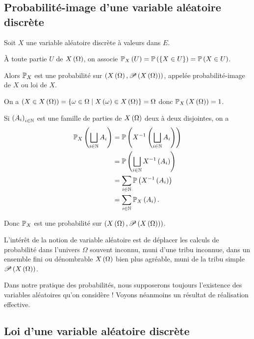 \subsection{Probabilité-image d'une variable aléatoire discrète}

\begin{prop}
Soit \(X\) une variable aléatoire discrète à valeurs dans \(E\).

À toute partie \(U\) de \(X\paren{\Omega}\), on associe \(\probacond{U}{X}=\proba{\accol{X\in U}}=\proba{X\in U}\).

Alors \(\prem_X\) est une probabilité sur \(\groupe{X\paren{\Omega}}[\P{X\paren{\Omega}}]\), appelée probabilité-image de \(X\) ou loi de \(X\).
\end{prop}

\begin{dem}
On a \(\paren{X\in X\paren{\Omega}}=\accol{\omega\in\Omega\tq X\paren{\omega}\in X\paren{\Omega}}=\Omega\) donc \(\probacond{X\paren{\Omega}}{X}=1\).

Si \(\paren{A_i}_{i\in\N}\) est une famille de parties de \(X\paren{\Omega}\) deux à deux disjointes, on a \[\begin{aligned}
\probacond{\bigsqcup_{i\in\N}A_i}{X}&=\proba{X\inv\paren{\bigsqcup_{i\in\N}A_i}} \\
&=\proba{\bigsqcup_{i\in\N}X\inv\paren{A_i}} \\
&=\sum_{i\in\N}\proba{X\inv\paren{A_i}} \\
&=\sum_{i\in\N}\probacond{A_i}{X}.
\end{aligned}\]

Donc \(\prem_X\) est une probabilité sur \(\paren{X\paren{\Omega},\P{X\paren{\Omega}}}\).
\end{dem}

\begin{rem}
L'intérêt de la notion de variable aléatoire est de déplacer les calculs de probabilité dans l'univers \(\Omega\) souvent inconnu, muni d'une tribu inconnue, dans un ensemble fini ou dénombrable \(X\paren{\Omega}\) bien plus agréable, muni de la tribu simple \(\P{X\paren{\Omega}}\).

Dans notre pratique des probabilités, nous supposerons toujours l'existence des variables aléatoires qu'on considère ! Voyons néanmoins un résultat de réalisation effective.
\end{rem}

\subsection{Loi d'une variable aléatoire discrète}

